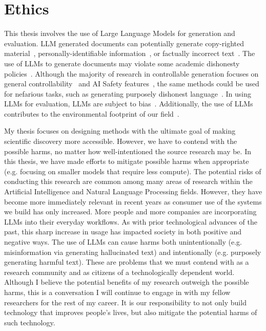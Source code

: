 \section{Ethics}
This thesis involves the use of Large Language Models for generation and evaluation. LLM generated documents can potentially generate copy-righted material~\cite{carlini21extracting}, personally-identifiable information~\cite{Lukas2023AnalyzingLO}, or factually incorrect text~\cite{Manakul2023SelfCheckGPTZB}. The use of LLMs to generate documents may violate some academic dishonesty policies~\cite{Zdravkova2023IntegrationOL}.
Although the majority of research in controllable generation focuses on general controllability~\cite{Keskar2019CTRLAC,Chen2024BenchmarkingLL,yang-klein-2021-fudge} and AI Safety features~\cite{zou2025representationengineeringtopdownapproach,rimsky-etal-2024-steering}, the same methods could be used for nefarious tasks, such as generating purposely dishonest language~\cite{BARMAN2024100545}. In using LLMs for evaluation, LLMs are subject to bias~\cite{Venkit2024AnAO,Stureborg2024LargeLM}. Additionally, the use of LLMs contributes to the environmental footprint of our field~\cite{Schwartz2019GreenA}.  

My thesis focuses on designing methods with the ultimate goal of making scientific discovery more accessible. However, we have to contend with the possible harms, no matter how well-intentioned the source research may be. In this thesis, we have made efforts to mitigate possible harms when appropriate (e.g. focusing on smaller models that require less compute). The potential risks of conducting this research are common among many areas of research within the Artificial Intelligence and Natural Language Processing fields. However, they have become more immediately relevant in recent years as consumer use of the systems we build has only increased. More people and more companies are incorporating LLMs into their everyday workflows. As with prior technological advances of the past, this sharp increase in usage has impacted society in both positive and negative ways. The use of LLMs can cause harms both unintentionally (e.g. misinformation via generating hallucinated text) and intentionally (e.g. purposely generating harmful text). These are problems that we must contend with as a research community and as citizens of a technologically dependent world. Although I believe the potential benefits of my research outweigh the possible harms, this is a conversation I will continue to engage in with my fellow researchers for the rest of my career. It is our responsibility to not only build technology that improves people's lives, but also mitigate the potential harms of such technology. 

